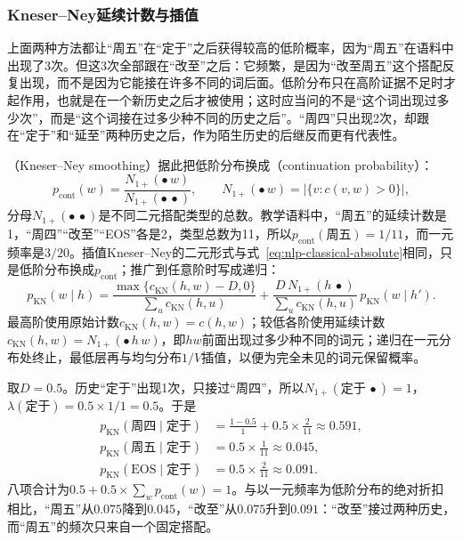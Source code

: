 \subsubsection{Kneser--Ney延续计数与插值}
\label{sec:nlp-classical-kneser-ney}

上面两种方法都让“周五”在“定于”之后获得较高的低阶概率，因为“周五”在语料中出现了3次。但这3次全部跟在“改至”之后：它频繁，是因为“改至周五”这个搭配反复出现，而不是因为它能接在许多不同的词后面。低阶分布只在高阶证据不足时才起作用，也就是在一个新历史之后才被使用；这时应当问的不是“这个词出现过多少次”，而是“这个词接在过多少种不同的历史之后”。“周四”只出现2次，却跟在“定于”和“延至”两种历史之后，作为陌生历史的后继反而更有代表性。

（Kneser--Ney smoothing）据此把低阶分布换成（continuation probability）：
\begin{equation}
  p_{\mathrm{cont}}(w)=\frac{N_{1+}(\bullet\,w)}{N_{1+}(\bullet\,\bullet)},\qquad
  N_{1+}(\bullet\,w)=|\{v:c(v,w)>0\}|,
  \label{eq:nlp-classical-kn-continuation}
\end{equation}
分母$N_{1+}(\bullet\,\bullet)$是不同二元搭配类型的总数。教学语料中，“周五”的延续计数是1，“周四”“改至”“EOS”各是2，类型总数为11，所以$p_{\mathrm{cont}}(\text{周五})=1/11$，而一元频率是$3/20$。插值Kneser--Ney的二元形式与式~\eqref{eq:nlp-classical-absolute}相同，只是低阶分布换成$p_{\mathrm{cont}}$；推广到任意阶时写成递归：
\begin{equation}
  p_{\mathrm{KN}}(w\mid h)=\frac{\max\{c_{\mathrm{KN}}(h,w)-D,0\}}{\sum_{u}c_{\mathrm{KN}}(h,u)}
  +\frac{D\,N_{1+}(h\,\bullet)}{\sum_{u}c_{\mathrm{KN}}(h,u)}\,p_{\mathrm{KN}}(w\mid h').
  \label{eq:nlp-classical-kn}
\end{equation}
最高阶使用原始计数$c_{\mathrm{KN}}(h,w)=c(h,w)$；较低各阶使用延续计数$c_{\mathrm{KN}}(h,w)=N_{1+}(\bullet\,h\,w)$，即$hw$前面出现过多少种不同的词元；递归在一元分布处终止，最低层再与均匀分布$1/V$插值，以便为完全未见的词元保留概率。

\begin{example}
  \label{ex:nlp-classical-kneser-ney}
  取$D=0.5$。历史“定于”出现1次，只接过“周四”，所以$N_{1+}(\text{定于}\,\bullet)=1$，$\lambda(\text{定于})=0.5\times1/1=0.5$。于是
  \[
  \begin{aligned}
    p_{\mathrm{KN}}(\text{周四}\mid\text{定于})&=\frac{1-0.5}{1}+0.5\times\frac{2}{11}\approx0.591,\\
    p_{\mathrm{KN}}(\text{周五}\mid\text{定于})&=0.5\times\frac{1}{11}\approx0.045,\\
    p_{\mathrm{KN}}(\mathrm{EOS}\mid\text{定于})&=0.5\times\frac{2}{11}\approx0.091.
  \end{aligned}
  \]
  八项合计为$0.5+0.5\times\sum_w p_{\mathrm{cont}}(w)=1$。与以一元频率为低阶分布的绝对折扣相比，“周五”从$0.075$降到$0.045$，“改至”从$0.075$升到$0.091$：“改至”接过两种历史，而“周五”的频次只来自一个固定搭配。
\end{example}

